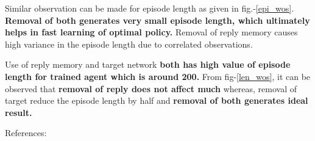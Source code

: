 \documentclass[preprint,12pt]{elsarticle}
\begin{document}
	Similar observation can be made for episode length as given in fig.-\ref{epi_wos}.\textbf{ Removal of both generates very small episode length, which ultimately helps in fast learning of optimal policy.} Removal of reply memory causes high variance in the episode length due to correlated observations. 
	
	Use of reply memory and target network \textbf{both has high value of episode length for trained agent which is around 200.} From fig-\ref{len_wos}, it can be observed that \textbf{removal of reply does not affect much} whereas, removal of target reduce the episode length by half and \textbf{removal of both generates ideal result.}
	
	\newpage
	
	References:
	\\
	
	
	
	
						
	
	
	
	
	
\end{document}

